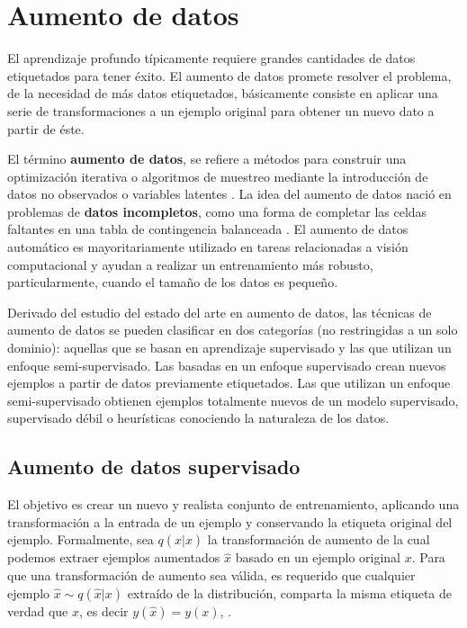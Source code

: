
\section{Aumento de datos}

El aprendizaje profundo típicamente requiere grandes cantidades de datos etiquetados para tener éxito. El aumento de datos promete resolver el problema, de la necesidad de más datos etiquetados, básicamente consiste en aplicar una serie de transformaciones a un ejemplo original para obtener un nuevo dato a partir de éste.

El término \textbf{aumento de datos}, se refiere a métodos para construir una optimización iterativa o algoritmos de muestreo mediante la introducción de datos no observados o variables latentes \citep{van2001art}. La idea del aumento de datos nació en problemas de \textbf{datos incompletos}, como una forma de completar las celdas faltantes en una tabla de contingencia balanceada \citep{dempster1977maximum}. El aumento de datos automático es mayoritariamente utilizado en tareas relacionadas a visión computacional y ayudan a realizar un entrenamiento más robusto, particularmente, cuando el tamaño de los datos es pequeño. 


Derivado del estudio del estado del arte en aumento de datos, las técnicas de aumento de datos se pueden clasificar en dos categorías (no restringidas a un solo dominio): aquellas que se basan en aprendizaje supervisado y las que utilizan un enfoque semi-supervisado. Las basadas en un enfoque supervisado crean nuevos ejemplos a partir de datos previamente etiquetados. Las que utilizan un enfoque semi-supervisado obtienen ejemplos totalmente nuevos de un modelo supervisado, supervisado débil o heurísticas conociendo la naturaleza de los datos.


\subsection{Aumento de datos supervisado} El objetivo es crear un nuevo y realista conjunto de entrenamiento, aplicando una transformación a la entrada de un ejemplo y conservando la etiqueta original del ejemplo. Formalmente, sea $q(\hat{x}|x)$ la transformación de aumento de la cual podemos extraer ejemplos aumentados $\hat{x}$ basado en un ejemplo original $x$. Para que una transformación de aumento sea válida, es requerido que cualquier ejemplo $\hat{x} \sim q(\hat{x}|x)$ extraído de la distribución, comparta la misma etiqueta de verdad que $x$, es decir $y(\hat{x})=y(x)$, \citep{xie2019unsupervised}.

